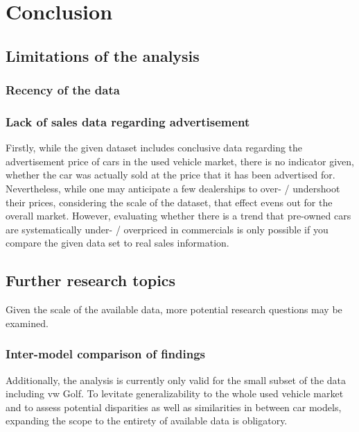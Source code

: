 \chapter{Conclusion}
\section{Limitations of the analysis}
\subsection{Recency of the data} %
\subsection{Lack of sales data regarding advertisement}
Firstly, while the given dataset includes conclusive data regarding the advertisement price of cars in the used vehicle market,
there is no indicator given, whether the car was actually sold at the price that it has been advertised for. 
\newline
Nevertheless, while one may anticipate a few dealerships to over- / undershoot their prices,
considering the scale of the dataset, that effect evens out for the overall market.
However, evaluating whether there is a trend that pre-owned cars are systematically under- / overpriced in commercials
is only possible if you compare the given data set to real sales information.

\section{Further research topics}
Given the scale of the available data, more potential research questions may be examined. 

\subsection{Inter-model comparison of findings}
Additionally, the analysis is currently only valid for the small subset of the data including \ac{vw} Golf. 
To levitate generalizability to the whole used vehicle market and to assess potential disparities as well as similarities in between 
car models, expanding the scope to the entirety of available data is obligatory.  
